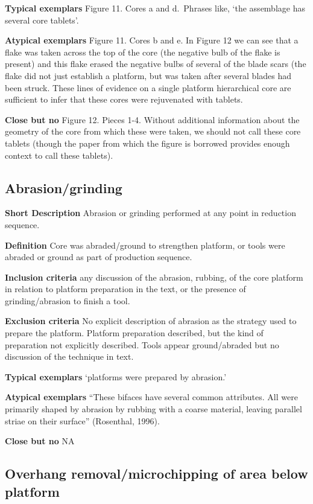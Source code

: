 \documentclass[
]{article}
\begin{document}
\textbf{Typical exemplars} Figure 11. Cores a and d.~Phrases like, `the
assemblage has several core tablets'.

\textbf{Atypical exemplars} Figure 11. Cores b and e. In Figure 12 we
can see that a flake was taken across the top of the core (the negative
bulb of the flake is present) and this flake erased the negative bulbs
of several of the blade scars (the flake did not just establish a
platform, but was taken after several blades had been struck. These
lines of evidence on a single platform hierarchical core are sufficient
to infer that these cores were rejuvenated with tablets.

\textbf{Close but no} Figure 12. Pieces 1-4. Without additional
information about the geometry of the core from which these were taken,
we should not call these core tablets (though the paper from which the
figure is borrowed provides enough context to call these tablets).

\hypertarget{abrasiongrinding}{%
\subsection{Abrasion/grinding}\label{abrasiongrinding}}

\textbf{Short Description} Abrasion or grinding performed at any point
in reduction sequence.

\textbf{Definition} Core was abraded/ground to strengthen platform, or
tools were abraded or ground as part of production sequence.

\textbf{Inclusion criteria} any discussion of the abrasion, rubbing, of
the core platform in relation to platform preparation in the text, or
the presence of grinding/abrasion to finish a tool.

\textbf{Exclusion criteria} No explicit description of abrasion as the
strategy used to prepare the platform. Platform preparation described,
but the kind of preparation not explicitly described. Tools appear
ground/abraded but no discussion of the technique in text.

\textbf{Typical exemplars} `platforms were prepared by abrasion.'

\textbf{Atypical exemplars} ``These bifaces have several common
attributes. All were primarily shaped by abrasion by rubbing with a
coarse material, leaving parallel striae on their surface'' (Rosenthal,
1996).

\textbf{Close but no} NA

\hypertarget{overhang-removalmicrochipping-of-area-below-platform}{%
\subsection{Overhang removal/microchipping of area below
platform}\label{overhang-removalmicrochipping-of-area-below-platform}}
\end{document}
